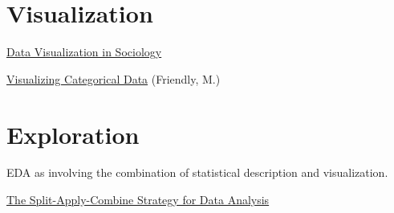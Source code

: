 \part{Visualization}

\href {http://kieranhealy.org/files/papers/data-visualization.pdf}{Data Visualization in Sociology}

\href{http://www.datavis.ca/books/vcd/}{Visualizing Categorical Data} (Friendly, M.)

\part{Exploration}
\label{part:eda}

EDA as involving the combination of statistical description and visualization.

\href{http://www.jstatsoft.org/v40/i01}{The Split-Apply-Combine Strategy for Data Analysis}

